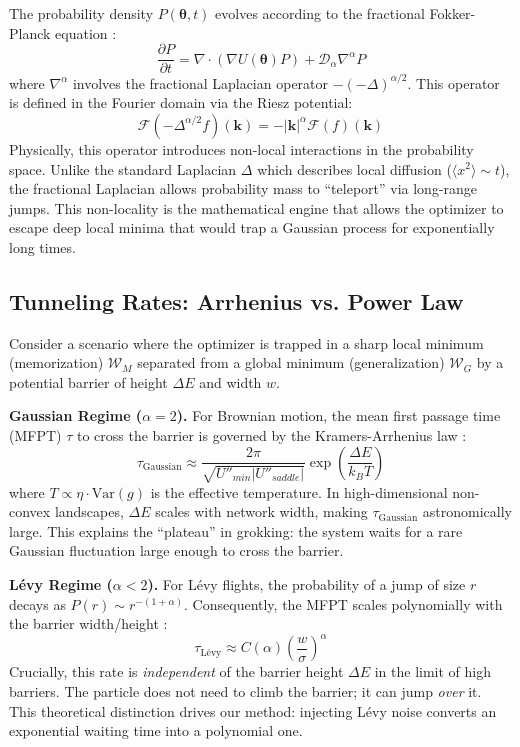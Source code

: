 \documentclass{article}
\theoremstyle{plain}
\theoremstyle{definition}
\theoremstyle{remark}
\newcommand{\W}{\mathcal{W}}
\newcommand{\thetavec}{\boldsymbol{\theta}}
\begin{document}
The probability density $P(\thetavec, t)$ evolves according to the fractional Fokker-Planck equation \cite{metzler2000random}:
\begin{equation}
    \frac{\partial P}{\partial t} = \nabla \cdot (\nabla U(\thetavec) P) + \mathcal{D}_\alpha \nabla^\alpha P
    \label{eq:fokker_planck}
\end{equation}
where $\nabla^\alpha$ involves the fractional Laplacian operator $-(-\Delta)^{\alpha/2}$. This operator is defined in the Fourier domain via the Riesz potential:
\begin{equation}
    \mathcal{F}(-\Delta^{\alpha/2} f)(\mathbf{k}) = -|\mathbf{k}|^\alpha \mathcal{F}(f)(\mathbf{k})
\end{equation}
Physically, this operator introduces non-local interactions in the probability space. Unlike the standard Laplacian $\Delta$ which describes local diffusion ($\langle x^2 \rangle \sim t$), the fractional Laplacian allows probability mass to ``teleport'' via long-range jumps. This non-locality is the mathematical engine that allows the optimizer to escape deep local minima that would trap a Gaussian process for exponentially long times.

\subsection{Tunneling Rates: Arrhenius vs. Power Law}
Consider a scenario where the optimizer is trapped in a sharp local minimum (memorization) $\W_M$ separated from a global minimum (generalization) $\W_G$ by a potential barrier of height $\Delta E$ and width $w$.

\textbf{Gaussian Regime ($\alpha=2$).} 
For Brownian motion, the mean first passage time (MFPT) $\tau$ to cross the barrier is governed by the Kramers-Arrhenius law \cite{hanggi1990reaction}:
\begin{equation}
    \tau_{\text{Gaussian}} \approx \frac{2\pi}{\sqrt{U''_{min}|U''_{saddle}|}} \exp\left(\frac{\Delta E}{k_B T}\right)
\end{equation}
where $T \propto \eta \cdot \text{Var}(g)$ is the effective temperature. In high-dimensional non-convex landscapes, $\Delta E$ scales with network width, making $\tau_{\text{Gaussian}}$ astronomically large. This explains the ``plateau'' in grokking: the system waits for a rare Gaussian fluctuation large enough to cross the barrier.

\textbf{Lévy Regime ($\alpha < 2$).}
For Lévy flights, the probability of a jump of size $r$ decays as $P(r) \sim r^{-(1+\alpha)}$. Consequently, the MFPT scales polynomially with the barrier width/height \cite{pavlyukevich2007levy}:
\begin{equation}
    \tau_{\text{Lévy}} \approx C(\alpha) \left( \frac{w}{\sigma} \right)^\alpha
\end{equation}
Crucially, this rate is \textit{independent} of the barrier height $\Delta E$ in the limit of high barriers. The particle does not need to climb the barrier; it can jump \textit{over} it. This theoretical distinction drives our method: injecting Lévy noise converts an exponential waiting time into a polynomial one.
\end{document}
